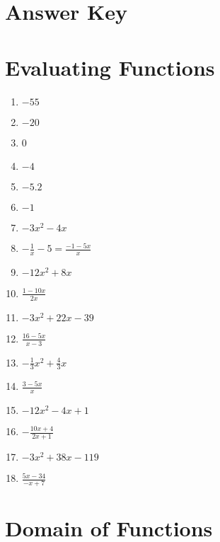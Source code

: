 \newpage

\section{Answer Key}

\section*{Evaluating Functions}

\begin{multicols}{3}
\begin{enumerate}
	\item $-55$
	\item $-20$
	\item 0
	\item $-4$
	\item $-5.2$
	\item $-1$
	\item $-3x^2 - 4x$
	\item $-\frac{1}{x}-5 = \frac{-1-5x}{x}$
	\item $-12x^2 + 8x$
	\item $\frac{1-10x}{2x}$
	\item $-3x^2 + 22x - 39$
	\item $\frac{16-5x}{x-3}$
	\item $-\frac{1}{3}x^2 + \frac{4}{3}x$
	\item $\frac{3-5x}{x}$
	\item $-12x^2 - 4x + 1$
	\item $-\frac{10x+4}{2x+1}$
	\item $-3x^2 + 38x - 119$
	\item $\frac{5x-34}{-x+7}$
\end{enumerate}
\end{multicols}

\section*{Domain of Functions}

